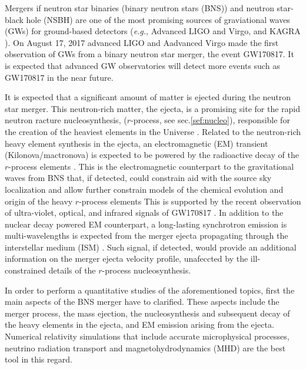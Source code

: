 \documentclass[11pt,a4paper,headinclude=true,DIV=14,BCOR=8mm,chapterprefix,listof=totoc,twoside,openright,abstracton]{scrbook}
\newcommand{\GW}{GW170817}
\newcommand{\eg}{\textit{e.g.}}
\newcommand{\rproc}{$r$-process}
\begin{document}
Mergers if neutron star binaries (binary neutron stars (BNS)) and neutron star-black hole 
(NSBH) are one of the most promising sources of graviational waves (GWs) for ground-based
detectors (\eg, Advanced LIGO and Virgo, and KAGRA \citep{Abadie:2010hv,Accadia:2010aa,Akutsu:2017kpk}).
On August 17, 2017 advanced LIGO and Aadvanced Virgo made the first observation of GWs from a binary 
neutron star merger, the event \GW{}. It is expected that advanced GW observatories will detect more
events such as \GW{} in the near future.

It is expected that a significant amount of matter is ejected during the neutron star merger. 
This neutron-rich matter, the ejecta, is a promising site for the rapid neutron racture 
nucleosynthesis, ($r$-process, see sec.\ref{sef:nucleo}), responsible for the creation of the 
heaviest elements in the Universe \citep{Lattimer:1974slx,Eichler:1989ve,Thielemann:2017acv}.
Related to the neutron-rich heavy element synthesis in the ejecta, an electromagnetic (EM) transient
(Kilonova/mactronova) is expected to be powered by the radioactive decay of the \rproc{} 
elements \citep{Li:1998bw,Metzger:2010,Roberts:2011,Goriely:2011vg,Korobkin:2012uy,Barnes:2013wka,Tanaka:2013ana}.
This is the electromagnetic counterpart to the gravitational waves from BNS that, if detected, 
could constrain aid with the source sky localization and allow further constrain models 
of the chemical evolution and origin of the heavy \rproc{} elements 
This is supported by the recent observation of ultra-violet, optical, and infrared signals of
\GW{} \citep{TheLIGOScientific:2017qsa,Tanaka:2017qxj,Arcavi:2017xiz,Coulter:2017wya,Cowperthwaite:2017dyu,Drout:2017ijr,Evans:2017mmy,Kasliwal:2018fwk,Pian:2017gtc,Smartt:2017fuw,Tanvir:2017pws}. 
In addition to the nuclear decay powered EM counterpart, a long-lasting synchrotron emission 
is multi-wavelengths is expected from the merger ejecta propagating through the interstellar
medium (ISM) \citep{Nakar:2011cw}. 
Such signal, if detected, would provide an additional information on the merger ejecta velocity profile,
unafeccted by the ill-constrained details of the \rproc{} nucleosynthesis. 

In order to perform a quantitative studies of the aforementioned topics, first the main aspects 
of the BNS merger have to clarified. These aspects include the merger process, the mass ejection, 
the nucleosynthesis and subsequent decay of the heavy elements in the ejecta, and EM emission
arising from the ejecta. Numerical relativity simulations that include accurate microphysical processes, 
neutrino radiation transport and magnetohydrodynamics (MHD) are the best tool in this regard. 
\end{document}
